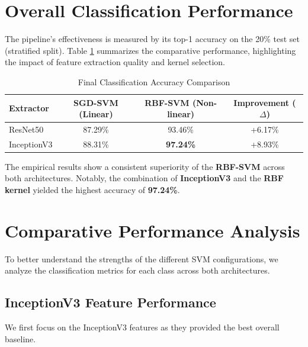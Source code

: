 \section{Overall Classification Performance}
The pipeline's effectiveness is measured by its top-1 accuracy on the 20\% test set (stratified split). Table \ref{tab:final_acc} summarizes the comparative performance, highlighting the impact of feature extraction quality and kernel selection.

\begin{table}[H]
    \centering
    \caption{Final Classification Accuracy Comparison}
    \label{tab:final_acc}
    \begin{tabular}{lccc}
        \toprule
        \textbf{Extractor} & \textbf{SGD-SVM (Linear)} & \textbf{RBF-SVM (Non-linear)} & \textbf{Improvement ($\Delta$)} \\
        \midrule
        ResNet50 & 87.29\% & 93.46\% & +6.17\% \\
        InceptionV3 & 88.31\% & \textbf{97.24\%} & +8.93\% \\
        \bottomrule
    \end{tabular}
\end{table}

The empirical results show a consistent superiority of the \textbf{RBF-SVM} across both architectures. Notably, the combination of \textbf{InceptionV3} and the \textbf{RBF kernel} yielded the highest accuracy of \textbf{97.24\%}.

\section{Comparative Performance Analysis}
To better understand the strengths of the different SVM configurations, we analyze the classification metrics for each class across both architectures. 

\subsection{InceptionV3 Feature Performance}
We first focus on the InceptionV3 features as they provided the best overall baseline.

